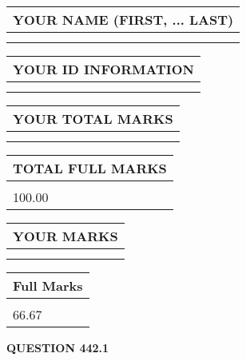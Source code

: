 \documentclass{ctexart}
\begin{document}
   
   
   
\newpage 
\setcounter{page}{ 
   442001 } 
   
   
   
   
\noindent\begin{tabular}{|l|}
\hline
YOUR NAME (FIRST, ... LAST)  \\
\hline
 \\ 
 \\ 
\hline
\end{tabular}
\hspace{0.05in} \begin{tabular}{|l|}
\hline
 YOUR   ID   INFORMATION  \\
\hline
 \\ 
 \\ 
\hline
\end{tabular}
   
   
\vspace{0.2in}\noindent\begin{tabular}{|l|}
\hline
YOUR TOTAL MARKS  \\
\hline
 \\ 
 \\ 
\hline
\end{tabular}
\hspace{0.05in} \begin{tabular}{|l|}
\hline
TOTAL FULL MARKS  \\
\hline
 \\ 
100.00 \\
\hline
\end{tabular}
   
   
 \vspace{0.2in}
 
 
 
 
   
   
  
\vspace{0.2in}
  
\noindent\begin{tabular}{|l|}
\hline
 YOUR MARKS  \\
\hline
 \\ 
 \\ 
\hline
\end{tabular}
\hspace{0.05in} \begin{tabular}{|l|}
\hline
 Full Marks  \\
\hline
 \\ 
66.67 \\
\hline
\end{tabular}
{\textbf{\Large{QUESTION
442.1 
}}}
  
\end{document}
